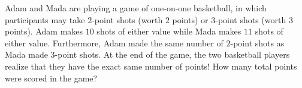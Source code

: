 Adam and Mada are playing a game of one-on-one basketball, in which participants may take $2$-point shots (worth $2$ points) or $3$-point shots (worth $3$ points). Adam makes $10$ shots of either value while Mada makes $11$ shots of either value. Furthermore, Adam made the same number of $2$-point shots as Mada made $3$-point shots. At the end of the game, the two basketball players realize that they have the exact same number of points! How many total points were scored in the game?